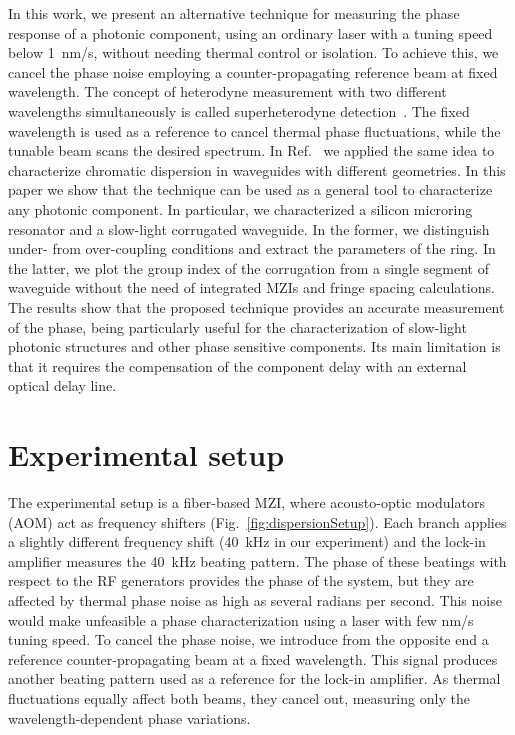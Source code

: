 \documentclass[journal]{IEEEtran}
\begin{document}
In this work, we present an alternative technique for measuring the phase response of a photonic component, using an ordinary laser with a tuning speed below 1~nm/s, without needing thermal control or isolation.
To achieve this, we cancel the phase noise employing a counter-propagating reference beam at fixed wavelength.
The concept of heterodyne measurement with two different wavelengths simultaneously is called superheterodyne detection~\cite{Dandliker1988}.
The fixed wavelength is used as a reference to cancel thermal phase fluctuations, while the tunable beam scans the desired spectrum.
In Ref.~\cite{Mas2012} we applied the same idea to characterize chromatic dispersion in waveguides with different geometries.
In this paper we show that the technique can be used as a general tool to characterize any photonic component.
In particular, we characterized a silicon microring resonator and a slow-light corrugated waveguide.
In the former, we distinguish under- from over-coupling conditions and extract the parameters of the ring.
In the latter, we plot the group index of the corrugation from a single segment of waveguide without the need of integrated MZIs and fringe spacing calculations.
The results show that the proposed technique provides an accurate measurement of the phase, being particularly useful for the characterization of slow-light photonic structures and other phase sensitive components.
Its main limitation is that it requires the compensation of the component delay with an external optical delay line.


\section{Experimental setup}
The experimental setup is a fiber-based MZI, where acousto-optic modulators (AOM) act as frequency shifters (Fig.~\ref{fig:dispersionSetup}).
Each branch applies a slightly different frequency shift (40~kHz in our experiment) and the lock-in amplifier measures the 40~kHz beating pattern.
The phase of these beatings with respect to the RF generators provides the phase of the system, but they are affected by thermal phase noise as high as several radians per second. 
This noise would make unfeasible a phase characterization using a laser with few nm/s tuning speed.
To cancel the phase noise, we introduce from the opposite end a reference counter-propagating beam at a fixed wavelength.
This signal produces another beating pattern used as a reference for the lock-in amplifier.
As thermal fluctuations equally affect both beams, they cancel out, measuring only the wavelength-dependent phase variations.
\end{document}
